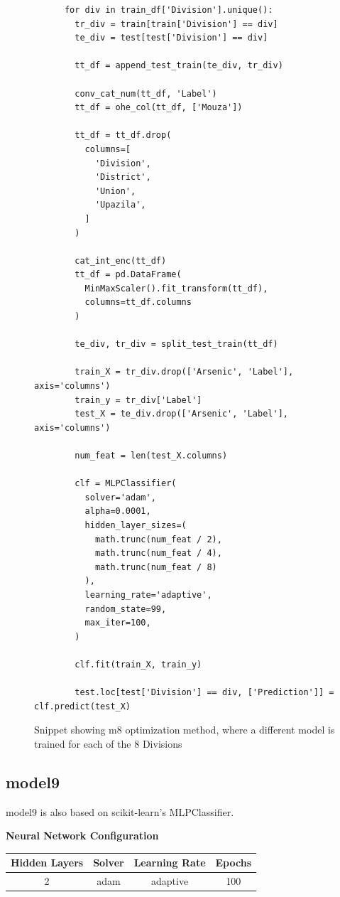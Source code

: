 \begin{figure}[h]
    \begin{verbatim}
      for div in train_df['Division'].unique():
        tr_div = train[train['Division'] == div]
        te_div = test[test['Division'] == div]
    
        tt_df = append_test_train(te_div, tr_div)
    
        conv_cat_num(tt_df, 'Label')
        tt_df = ohe_col(tt_df, ['Mouza'])
    
        tt_df = tt_df.drop(
          columns=[
            'Division',
            'District',
            'Union',
            'Upazila',
          ]
        )
    
        cat_int_enc(tt_df)
        tt_df = pd.DataFrame(
          MinMaxScaler().fit_transform(tt_df), 
          columns=tt_df.columns
        )
    
        te_div, tr_div = split_test_train(tt_df)
    
        train_X = tr_div.drop(['Arsenic', 'Label'], axis='columns')
        train_y = tr_div['Label']
        test_X = te_div.drop(['Arsenic', 'Label'], axis='columns')
    
        num_feat = len(test_X.columns)
    
        clf = MLPClassifier(
          solver='adam',
          alpha=0.0001,
          hidden_layer_sizes=(
            math.trunc(num_feat / 2), 
            math.trunc(num_feat / 4), 
            math.trunc(num_feat / 8)
          ),
          learning_rate='adaptive',
          random_state=99,
          max_iter=100,
        )
    
        clf.fit(train_X, train_y)
    
        test.loc[test['Division'] == div, ['Prediction']] = clf.predict(test_X)
    \end{verbatim}
    \caption{Snippet showing m8 optimization method, where a different model is trained for each of the 8 Divisions}
    \label{fig:x m8_code}
\end{figure}

\subsection{model9}

model9 is also based on scikit-learn's MLPClassifier.

\textbf{Neural Network Configuration}

\begin{center}
    \begin{tabular}{|c c c c|} 
         \hline
         Hidden Layers & Solver & Learning Rate & Epochs \\ [0.5ex] 
         \hline\hline
         2 & adam & adaptive & 100 \\ 
         \hline
    \end{tabular}
\end{center}

